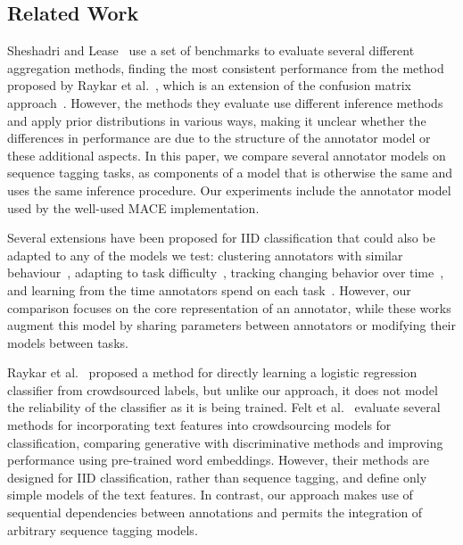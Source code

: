 \subsection{Related Work}

Sheshadri and Lease~ use a set of benchmarks to evaluate 
several different aggregation methods, finding the most consistent performance from the method
proposed by Raykar et al.~, which is an extension of the 
confusion matrix approach~\cite{dawid_maximum_1979}.
However, the methods they evaluate use different inference methods and apply prior distributions
in various ways, making it unclear whether the differences in performance are due to the 
structure of the annotator model or these additional aspects. 
In this paper, we compare several annotator models on sequence tagging tasks,
as components of a model that is otherwise the same and uses the same inference procedure.
Our experiments include the annotator model used by the well-used MACE implementation\cite{hovy2013learning}.

Several extensions have been proposed for IID classification
that could also be adapted to any of the models we test:
clustering annotators with similar behaviour~\cite{venanzi2014community,moreno_bayesian_2015},
adapting to task difficulty~\cite{whitehill2009whose,bachrach2012grade},
tracking changing behavior over time~\cite{simpson2015bayesian}, and
learning from the time annotators spend on each task~\cite{venanzi2016time}.
However, our comparison focuses on the core representation of an annotator, 
while these works augment this model by sharing parameters between annotators 
or modifying their models between tasks.

Raykar et al.~ proposed a method for directly learning a logistic
regression classifier from crowdsourced labels, but unlike our approach, it does not model the 
reliability of the classifier as it is being trained.
Felt et al.~ evaluate several methods for incorporating text features into  
crowdsourcing models for classification, comparing generative with discriminative methods and improving performance using
pre-trained word embeddings. However, their methods are designed for IID classification, rather than sequence tagging, 
and define only simple models of the text features. In contrast, our approach makes use of sequential dependencies
between annotations and permits the integration of arbitrary sequence tagging models.

